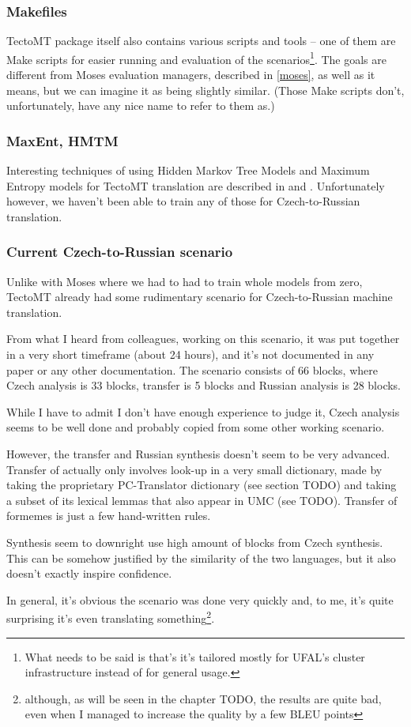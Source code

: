 \subsubsection{Makefiles}

TectoMT package itself also contains various scripts and tools -- one of them are Make scripts for easier running and evaluation of the scenarios\footnote{What needs to be said is that's it's tailored mostly for UFAL's cluster infrastructure instead of for general usage.}. The goals are different from Moses evaluation managers, described in \ref{moses}, as well as it means, but we can imagine it as being slightly similar. (Those Make scripts don't, unfortunately, have any nice name to refer to them as.)

\subsubsection{MaxEnt, HMTM}
Interesting techniques of using Hidden Markov Tree Models and Maximum Entropy models for TectoMT translation are described in \cite{tecto_hmtm} and \cite{tecto_maxent}. Unfortunately however, we haven't been able to train any of those for Czech-to-Russian translation.

\subsubsection{Current Czech-to-Russian scenario}
Unlike with Moses where we had to had to train whole models from zero, TectoMT already had some rudimentary scenario for Czech-to-Russian machine translation.

From what I heard from colleagues, working on this scenario, it was put together in a very short timeframe (about 24 hours), and it's not documented in any paper or any other documentation. The scenario consists of 66 blocks, where Czech analysis is 33 blocks, transfer is 5 blocks and Russian analysis is 28 blocks. 

While I have to admit I don't have enough experience to judge it, Czech analysis seems to be well done and probably copied from some other working scenario.

However, the transfer and Russian synthesis doesn't seem to be very advanced. Transfer of  actually only involves look-up in a very small dictionary, made by taking the proprietary PC-Translator dictionary (see section TODO) and taking a subset of its lexical lemmas that also appear in UMC (see TODO). Transfer of formemes is just a few hand-written rules.

Synthesis seem to downright use high amount of blocks from Czech synthesis. This can be somehow justified by the similarity of the two languages, but it also doesn't exactly inspire confidence.

In general, it's obvious the scenario was done very quickly and, to me, it's quite surprising it's even translating something\footnote{although, as will be seen in the chapter TODO, the results are quite bad, even when I managed to increase the quality by a few BLEU points}.
